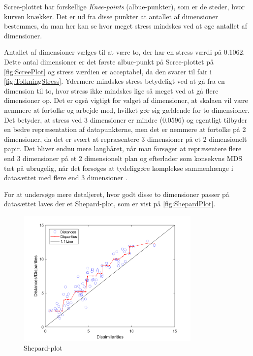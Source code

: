 \noindent Scree-plottet har forskellige \textit{Knee-points} (albue-punkter), som er de steder, hvor kurven knækker. Det er ud fra disse punkter at antallet af dimensioner bestemmes, da man her kan se hvor meget stress mindskes ved at øge antallet af dimensioner. 

\noindent Antallet af dimensioner vælges til at være to, der har en stress værdi på 0.1062. Dette antal dimensioner er det første albue-punkt på Scree-plottet på \autoref{fig:ScreePlot} og stress værdien er acceptabel, da den svarer til fair i \autoref{fig:TolkningStress}. Ydermere mindskes stress betydeligt ved at gå fra en dimension til to, hvor stress ikke mindskes lige så meget ved at gå flere dimensioner op. Det er også vigtigt for valget af dimensioner, at skalaen vil være nemmere at fortolke og arbejde med, hvilket gør sig gældende for to dimensioner. Det betyder, at stress ved 3 dimensioner er mindre (0.0596) og egentligt tilbyder en bedre repræsentation af datapunkterne, men det er nemmere at fortolke på 2 dimensioner, da det er svært at repræsentere 3 dimensioner på et 2 dimensionelt papir. Det bliver endnu mere langhåret, når man forsøger at repræsentere flere end 3 dimensioner på et 2 dimensionelt plan og efterlader som konsekvns MDS tæt på ubrugelig, når det forsøges at tydeliggøre komplekse sammenhænge i datasættet med flere end 3 dimensioner \parencite{Borgatti1997}. 

For at undersøge mere detaljeret, hvor godt disse to dimensioner passer på datasættet laves der et Shepard-plot, som er vist på \autoref{fig:ShepardPlot}.

\begin{figure}[H]
\centering
\includegraphics[width = 0.8\textwidth]{Figure/Sheppard_plot.png} 
\caption{Shepard-plot}
\label{fig:ShepardPlot}
\end{figure}

